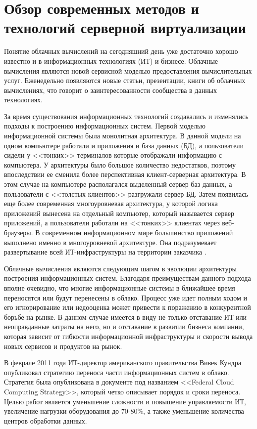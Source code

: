 \section{Обзор современных методов и технологий серверной виртуализации} \label{literature}

Понятие облачных вычислений на сегодняшний день уже достаточно хорошо известно и в информационных технологиях (ИТ) и бизнесе.
Облачные вычисления являются новой сервисной моделью предоставления вычислительных услуг.
Еженедельно появляются новые статьи, презентации, книги об облачных вычислениях, что говорит о заинтересованности сообщества в данных технологиях.

За время существования информационных технологий создавались и изменялись подходы к построению информационных систем.
Первой моделью информационной системы была монолитная архитектура.
В данной модели на одном компьютере работали и приложения и база данных (БД), а пользователи сидели у <<тонких>> терминалов которые отображали информацию с компьютера.
У архитектуры было большое количество недостатков, поэтому впоследствии ее сменила более перспективная клиент-серверная архитектура.
В этом случае на компьютере располагался выделенный сервер баз данных, а пользователи с <<толстых клиентов>> разгружали сервер БД.
Затем появилась еще более современная многоуровневая архитектура, у которой логика приложений вынесена на отдельный компьютер, который называется сервер приложений, а пользователи работали на <<тонких>> клиентах через веб-браузеры.
В современном информационном мире большинство приложений выполнено именно в многоуровневой архитектуре.
Она подразумевает развертывание всей ИТ-инфраструктуры на территории заказчика \cite{oracle-db}.

Облачные вычисления являются следующим шагом в эволюции архитектуры построения информационных систем.
Благодаря преимуществам данного подхода вполне очевидно, что многие информационные системы в ближайшее время переносятся или будут перенесены в облако.
Процесс уже идет полным ходом и его игнорирование или недооценка может привести к поражению в конкурентной борьбе на рынке.
В данном случае имеется в виду не только отставание ИТ или неоправданные затраты на него, но и отставание в развитии бизнеса компании, которая зависит от гибкости информационной инфраструктуры и скорости вывода новых сервисов и продуктов на рынок.

В феврале 2011 года ИТ-директор американского правительства Вивек Кундра опубликовал стратегию переноса части информационных систем в облако.
Стратегия была опубликована в документе под названием <<Federal Cloud Computing Strategy>>, который четко описывает порядок и сроки переноса.
Целью работ является уменьшение сложности и повышение управляемости ИТ, увеличение нагрузки оборудования до 70-80\%, а также уменьшение количества центров обработки данных.

